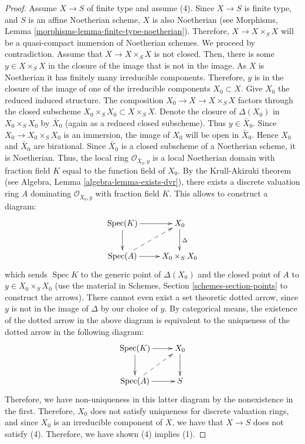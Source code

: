\documentclass{stacks-project}
\theoremstyle{plain}
\theoremstyle{definition}
\theoremstyle{remark}
\numberwithin{equation}{subsection}
\def\Spec{\mathop{\mathrm{Spec}}}
\begin{document}
\begin{proof}
\medskip\noindent
Assume $X \to S$ of finite type and assume (4).
Since $X \to S$ is finite type, and $S$ is an affine Noetherian
scheme, $X$ is also Noetherian (see
Morphisms, Lemma \ref{morphisms-lemma-finite-type-noetherian}).
Therefore, $X \to X \times_S X$ will
be a quasi-compact immersion of Noetherian schemes.  We proceed by
contradiction.  Assume that $X \to X \times_S X$ is not closed.  Then,
there is some $y \in X \times_S X$ in the closure of the image that is
not in the image. As $X$ is Noetherian it has finitely many irreducible
components. Therefore, $y$ is in the closure of the image of one of
the irreducible components $X_0 \subset X$.  Give $X_0$ the reduced
induced structure.  The composition $X_0 \to X \to X \times_S X$
factors through the closed subscheme $X_0 \times_S X_0 \subset X \times_S X$.
Denote the closure of $\Delta(X_0)$ in $X_0 \times_S X_0$
by $\bar X_0$ (again as a reduced closed subscheme). Thus $y \in \bar X_0$.
Since $X_0 \to X_0 \times_S X_0$ is an immersion, the image of $X_0$
will be open in $\bar X_0$. Hence $X_0$ and $\bar X_0$ are
birational. Since $\bar{X}_0$ is a closed subscheme of a
Noetherian scheme, it is Noetherian. Thus, the local ring
$\mathcal O_{{\bar X_0, y}}$ is a local Noetherian domain with fraction
field $K$ equal to the function field of $X_0$.  By the Krull-Akizuki
theorem (see Algebra, Lemma \ref{algebra-lemma-exists-dvr}), there exists a
discrete valuation ring $A$ dominating $\mathcal O_{{\bar X_0, y}}$
with fraction field $K$.  This allows to construct a diagram:
\begin{equation}
\label{equation-valuative-generic}
\xymatrix{
\Spec(K) \ar[r] \ar[d] & X_0 \ar[d]^{\Delta} \\
\Spec(A) \ar[r] \ar@{-->}[ur]& X_0 \times_S X_0 \\
}
\end{equation}
which sends $\Spec K$ to the generic point of $\Delta(X_0)$ and
the closed point of $A$ to $y \in X_0 \times_S X_0$ (use the material in
Schemes, Section \ref{schemes-section-points} to construct the arrows).
There cannot even exist
a set theoretic dotted arrow, since $y$ is not in the image of
$\Delta$ by our choice of $y$.  By categorical means, the existence of
the dotted arrow in the above diagram is equivalent to the uniqueness
of the dotted arrow in the following diagram:
\begin{equation}
\label{equation-valuative-nonexistent}
\xymatrix{
\Spec(K) \ar[r] \ar[d] & X_0 \ar[d]\\
\Spec(A) \ar[r] \ar@{-->}[ur] & S \\
}
\end{equation}
Therefore, we have non-uniqueness in this latter diagram by the
nonexistence in the first.  Therefore, $X_0$ does not satisfy
uniqueness for discrete valuation rings, and since $X_0$ is an
irreducible component of $X$, we have that $X \to S$ does not satisfy
(4).  Therefore, we have shown (4) implies (1).
\end{proof}
\end{document}
